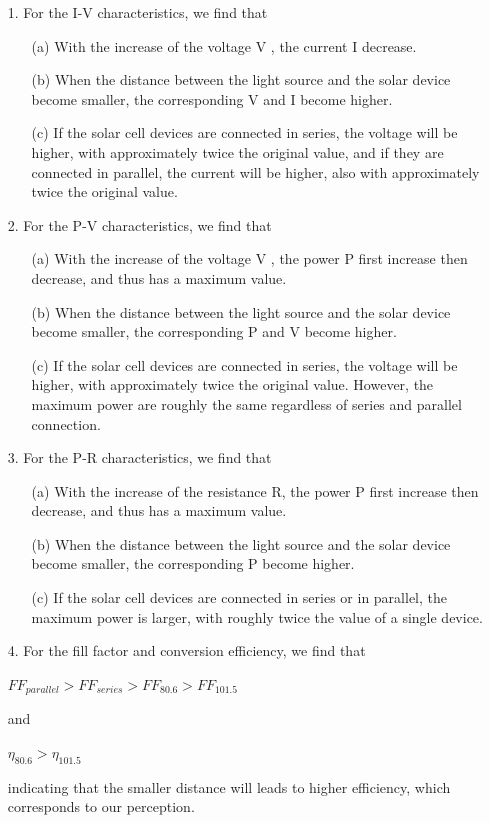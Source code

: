 \documentclass[a4paper,12pt]{article}
\begin{document}
\begin{itemize}
\item[1.] For the I-V characteristics, we find that 
		\begin{itemize}
		\item[(a)] With the increase of the voltage V , the current I decrease.
		\item[(b)] When the distance between the light source and the solar device become smaller, the corresponding V and I become higher. 
		\item[(c)] If the solar cell devices are connected in series, the voltage will be higher, with approximately twice the original value, and if they are connected in parallel, the current will be higher, also with approximately twice the original value.
		\end{itemize}

\item[2.] For the P-V characteristics, we find that 
		\begin{itemize}
		\item[(a)] With the increase of the voltage V , the power P first increase then decrease, and thus has a maximum value. 
		\item[(b)] When the distance between the light source and the solar device become smaller, the corresponding P and V become higher.
		\item[(c)] If the solar cell devices are connected in series, the voltage will be higher, with approximately twice the original value. However, the maximum power are roughly the same regardless of series and parallel connection. 
		\end{itemize}
		
\item[3.] For the P-R characteristics, we find that 
		\begin{itemize}
		\item[(a)] With the increase of the resistance R, the power P first increase then decrease, and thus has a maximum value. 
		\item[(b)] When the distance between the light source and the solar device become smaller, the corresponding P become higher.
		\item[(c)] If the solar cell devices are connected in series or in parallel, the maximum power is larger, with roughly twice the value of a single device.
		\end{itemize}
		
\item[4.] For the fill factor and conversion efficiency, we find that 
		\begin{center}
		$FF_{parallel} > FF_{series} > FF_{80.6} > FF_{101.5}$
		\end{center}
and 
		\begin{center}
		$\eta_{80.6} > \eta_{101.5}$
		\end{center}
indicating that the smaller distance will leads to higher efficiency, which corresponds to our perception.		
\end{itemize}
\end{document}
